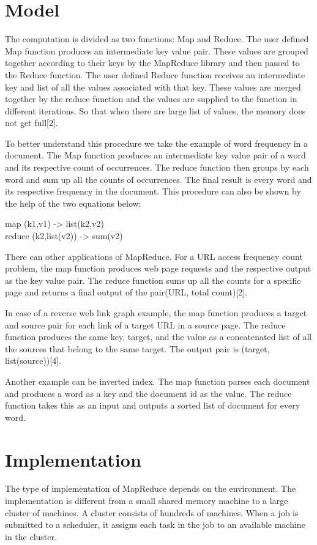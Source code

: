 \documentclass[sigconf]{acmart}
\begin{document}
\section{Model}
\par The computation is divided as two functions: Map and Reduce. The user defined Map function produces an intermediate key value pair. These values are grouped together according to their keys by the MapReduce library and then passed to the Reduce function. The user defined Reduce function receives an intermediate key and list of all the values associated with that key. These values are merged together by the reduce function and the values are supplied to the function in different iterations. So that when there are large list of values, the memory does not get full[2]. 
\par To better understand this procedure we take the example of word frequency in a document. The Map function produces an intermediate key value pair of a word and its respective count of occurrences. The reduce function then groups by each word and sum up all the counts of occurrences. The final result is every word and its respective frequency in the document.  This procedure can also be shown by the help of the two equations below:
\begin{center}
map    (k1,v1) ->  list(k2,v2)\\
reduce (k2,list(v2)) -> sum(v2)
\end{center} 
\par There can other applications of MapReduce. For a URL access frequency count problem, the map function produces web page requests and the respective output as the key value pair. The reduce function sums up all the counts for a specific page and returns a final output of the pair(URL, total count)[2]. 
\par In case of a reverse web link graph example, the map function produces a target and source pair for each link of a target URL in a source page. The reduce function produces the same key, target, and the value as a concatenated list of all the sources that belong to the same target. The output pair is (target, list(source))[4].
\par Another example can be inverted index. The map function parses each document and produces a word as a key and the document id as the value.  The reduce function takes this as an input and outputs a sorted list of document for every word. 
\section{Implementation}
\par The type of implementation of MapReduce depends on the environment. The implementation is different from a small shared memory machine to a large cluster of machines.  A cluster consists of hundreds of machines. When a job is submitted to a scheduler, it assigns each task in the job to an available machine in the cluster.
\end{document}
